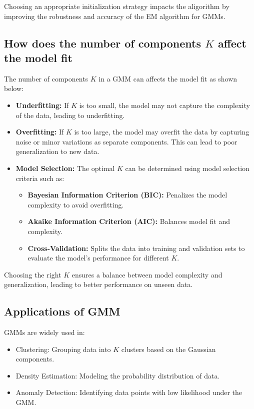 \documentclass{article}
\begin{document}
Choosing an appropriate initialization strategy impacts the aligorithm by improving the robustness and accuracy of the EM algorithm for GMMs.

\subsection*{How does the number of components \(K\) affect the model fit}
The number of components \(K\) in a GMM can affects the model fit as shown below:

\begin{itemize}
    \item \textbf{Underfitting:} If \(K\) is too small, the model may not capture the complexity of the data, leading to underfitting.
    \item \textbf{Overfitting:} If \(K\) is too large, the model may overfit the data by capturing noise or minor variations as separate components. This can lead to poor generalization to new data.
    \item \textbf{Model Selection:} The optimal \(K\) can be determined using model selection criteria such as:
    \begin{itemize}
        \item \textbf{Bayesian Information Criterion (BIC):} Penalizes the model complexity to avoid overfitting.
        \item \textbf{Akaike Information Criterion (AIC):} Balances model fit and complexity.
        \item \textbf{Cross-Validation:} Splits the data into training and validation sets to evaluate the model's performance for different \(K\).
    \end{itemize}
\end{itemize}

Choosing the right \(K\) ensures a balance between model complexity and generalization, leading to better performance on unseen data.

\subsection*{Applications of GMM}
GMMs are widely used in:
\begin{itemize}
    \item Clustering: Grouping data into \(K\) clusters based on the Gaussian components.
    \item Density Estimation: Modeling the probability distribution of data.
    \item Anomaly Detection: Identifying data points with low likelihood under the GMM.
\end{itemize}
\end{document}
